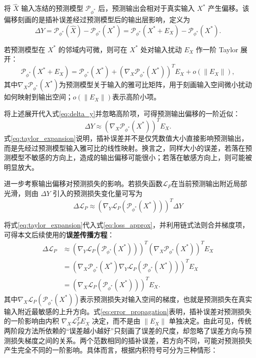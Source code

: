 \documentclass{article}
\begin{document}
将 $\hat{X}$ 输入冻结的预测模型 $\mathcal{P}_{\phi^\ast}$ 后，预测输出会相对于真实输入 $X^\ast$ 产生偏移。该偏移刻画的是插补误差经过预测模型后的输出层影响，定义为
\begin{equation}\label{eq:delta_y}
	\Delta Y =\mathcal{P}_{\phi^\ast}(\hat{X}) -\mathcal{P}_{\phi^\ast}(X^\ast) =\mathcal{P}_{\phi^\ast}(X^\ast + E_X) -\mathcal{P}_{\phi^\ast}(X^\ast).
\end{equation}

若预测模型在 $X^\ast$ 的邻域内可微，则可在 $X^\ast$ 处对输入扰动 $E_X$ 作一阶 Taylor 展开：
\begin{equation}
	\mathcal{P}_{\phi^\ast}(X^\ast + E_X) =\mathcal{P}_{\phi^\ast}(X^\ast) + (\nabla_X\mathcal{P}_{\phi^\ast}(X^\ast))^T E_X + o(\|E_X\|),
\end{equation}
其中$\nabla_X\mathcal{P}_{\phi^\ast}(X^\ast)$为预测模型关于输入的雅可比矩阵，用于刻画输入空间微小扰动如何映射到输出空间；$o(\|E_X\|)$表示高阶小项。

将上述展开代入式\ref{eq:delta_y}并忽略高阶项，可得预测输出偏移的一阶近似：
\begin{equation}\label{eq:taylor_expansion}
	\Delta Y\approx (\nabla_X\mathcal{P}_{\phi^\ast}(X^\ast))^T E_X.
\end{equation}
式\ref{eq:taylor_expansion}说明，插补误差并不是仅凭数值大小直接影响预测输出，而是先经过预测模型输入雅可比的线性映射。换言之，同样大小的误差，若落在预测模型不敏感的方向上，造成的输出偏移可能很小；若落在敏感方向上，则可能被明显放大。

进一步考察输出偏移对预测损失的影响。若损失函数$\mathcal{L}_P$在当前预测输出附近局部光滑，则由 $\Delta Y$ 引入的预测损失变化量可写为
\begin{equation}\label{eq:loss_approx}
	\Delta\mathcal{L}_P\approx (\nabla_Y\mathcal{L}_P(\mathcal{P}_{\phi^\ast}(X^\ast)))^T\Delta Y
\end{equation}

将式\ref{eq:taylor_expansion}代入式\ref{eq:loss_approx}，并利用链式法则合并梯度项，可得本文后续使用的\textbf{误差传播方程}：
\begin{equation}\label{eq:error_propagation}
	\begin{aligned}
		\Delta\mathcal{L}_P
		&\approx (\nabla_Y\mathcal{L}_P(\mathcal{P}_{\phi^\ast}(X^\ast)))^T
		(\nabla_X\mathcal{P}_{\phi^\ast}(X^\ast))^T E_X\\
		&= (\nabla_X\mathcal{P}_{\phi^\ast}(X^\ast)
		\nabla_Y\mathcal{L}_P(\mathcal{P}_{\phi^\ast}(X^\ast)))^T E_X\\
		&= (\nabla_X\mathcal{L}_P(\mathcal{P}_{\phi^\ast}(X^\ast)))^T E_X.
	\end{aligned}
\end{equation}
其中$\nabla_X\mathcal{L}_P(\mathcal{P}_{\phi^\ast}(X^\ast))$表示预测损失对输入空间的梯度，也就是预测损失在真实输入附近最敏感的上升方向。式\ref{eq:error_propagation}表明，插补误差对预测损失的一阶影响由内积
$\nabla_X\mathcal{L}_P^T E_X$ 决定，而不是由 $\|E_X\|$ 单独决定。由此可见，传统两阶段方法所依赖的“误差越小越好”只刻画了误差的尺度，却忽略了误差方向与预测损失梯度之间的关系。两个范数相同的插补误差，若方向不同，可能对预测损失产生完全不同的一阶影响。具体而言，根据内积符号可分为三种情形：
\end{document}
